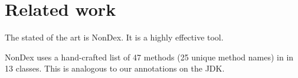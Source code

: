 \section{Related work}\label{sec:related}


The stated of the art is NonDex.  It is a highly effective tool.

NonDex uses a hand-crafted list of 47 methods (25 unique method names) in
in 13 classes.
This is analogous to our annotations on the JDK\@.

